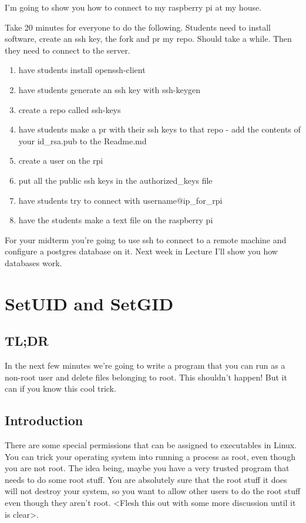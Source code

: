 \documentclass[12pt]{article}
\begin{document}
I'm going to show you how to connect to my raspberry pi at my house.

Take 20 minutes for everyone to do the following. Students need to install software, create an ssh key, the fork and pr my repo. Should take a while. Then they need to connect to the server.

\begin{center}
\begin{enumerate}
\item have students install openssh-client
\item have students generate an ssh key with ssh-keygen
\item create a repo called ssh-keys
\item have students make a pr with their ssh keys to that repo - add the contents of your id_rsa.pub to the Readme.md
\item create a user on the rpi
\item put all the public ssh  keys in the authorized_keys file
\item have students try to connect with username@ip_for_rpi
\item have the students make a text file on the raspberry pi
\end{enumerate}
\end{center}

For your midterm you're going to use ssh to connect to a remote machine and configure a postgres database on it.
Next week in Lecture I'll show you how databases work.


\section{SetUID and SetGID}
\subsection{TL;DR}
In the next few minutes we're going to write a program that you can run as a non-root user and delete  files belonging to root. This shouldn't happen! But it can if you know this cool trick. 

\subsection{Introduction}
There are some special permissions that can be assigned to executables in Linux. You can trick your operating system into running a process as root, even though you are not root. The idea being, maybe you have a very trusted program that needs to do some root stuff. You are absolutely sure that the root stuff it does will not destroy your system, so you want to allow other users to do the root stuff even though they aren't root. <Flesh this out with some more discussion until it is clear>. 
  
\end{document}
